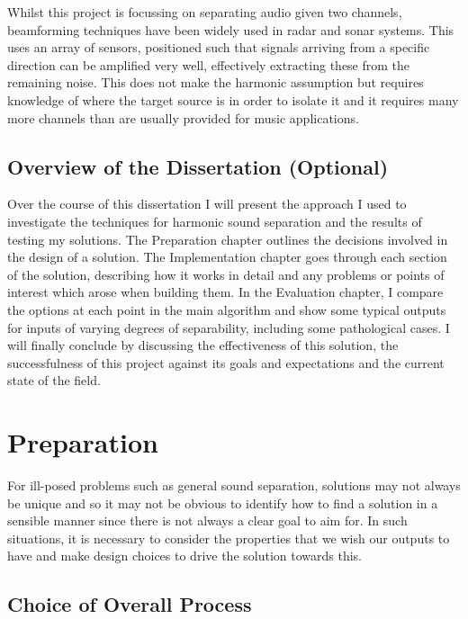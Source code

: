 \documentclass[10pt,twoside,a4paper]{report}
\begin{document}
Whilst this project is focussing on separating audio given two channels, beamforming techniques have been widely used in radar and sonar systems. This uses an array of sensors, positioned such that signals arriving from a specific direction can be amplified very well, effectively extracting these from the remaining noise. This does not make the harmonic assumption but requires knowledge of where the target source is in order to isolate it and it requires many more channels than are usually provided for music applications.

\section{Overview of the Dissertation (Optional)}

Over the course of this dissertation I will present the approach I used to investigate the techniques for harmonic sound separation and the results of testing my solutions. The Preparation chapter outlines the decisions involved in the design of a solution. The Implementation chapter goes through each section of the solution, describing how it works in detail and any problems or points of interest which arose when building them. In the Evaluation chapter, I compare the options at each point in the main algorithm and show some typical outputs for inputs of varying degrees of separability, including some pathological cases. I will finally conclude by discussing the effectiveness of this solution, the successfulness of this project against its goals and expectations and the current state of the field.

\chapter{Preparation}

For ill-posed problems such as general sound separation, solutions may not always be unique and so it may not be obvious to identify how to find a solution in a sensible manner since there is not always a clear goal to aim for. In such situations, it is necessary to consider the properties that we wish our outputs to have and make design choices to drive the solution towards this.

\section{Choice of Overall Process}
\end{document}
